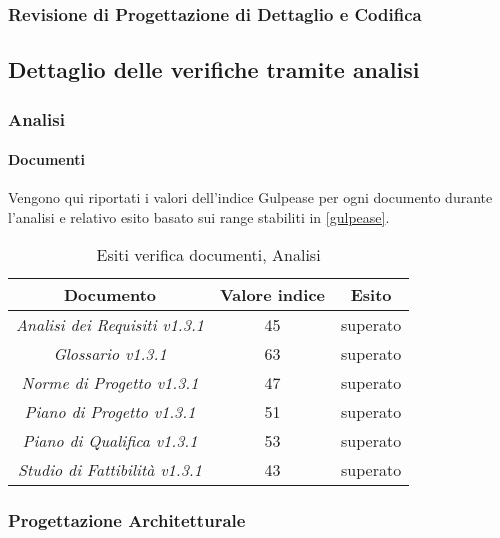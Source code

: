	\subsubsection{Revisione di Progettazione di Dettaglio e Codifica}
	
	 \pagebreak
	 
	 \subsection{Dettaglio delle verifiche tramite analisi}
	 \label{DettaglioVerificheAnalisi}
	 
	 	\subsubsection{Analisi}
	 	\paragraph{Documenti}
	 	Vengono qui riportati i valori dell’indice Gulpease per ogni documento durante l'analisi e relativo esito basato sui range stabiliti in \ref{gulpease}.
	
	\begin{table}[H]
	\centering
	\begin{tabular}{ | c | c | c | }
    \hline
    Documento & Valore indice & Esito \\ \hline
     \emph{Analisi dei Requisiti v1.3.1} & 45 &  superato \\ \hline
     \emph{Glossario v1.3.1} & 63 &  superato \\ \hline
     \emph{Norme di Progetto v1.3.1} & 47 &  superato \\ \hline
     \emph{Piano di Progetto v1.3.1} & 51 &  superato \\ \hline
     \emph{Piano di Qualifica v1.3.1} & 53 &  superato \\ \hline
     \emph{Studio di Fattibilità v1.3.1} & 43 &  superato \\ \hline
    \end{tabular}
	\caption{Esiti verifica documenti, Analisi}
	\end{table}
	
	
	\subsubsection{Progettazione Architetturale}
